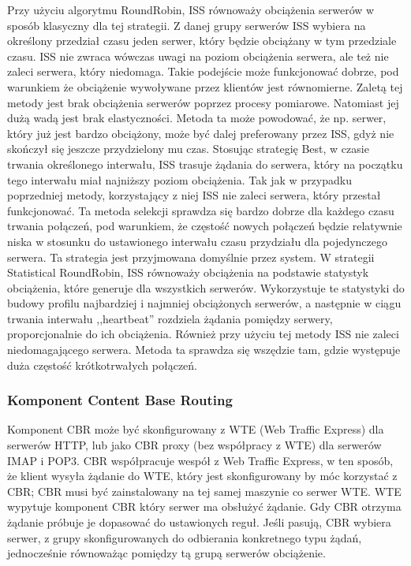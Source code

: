 Przy użyciu algorytmu RoundRobin, ISS równoważy obciążenia serwerów w sposób klasyczny dla tej strategii. Z danej grupy 
serwerów ISS wybiera na określony przedział czasu jeden serwer, który będzie obciążany w tym przedziale czasu. ISS nie zwraca 
wówczas uwagi na poziom obciążenia serwera, ale też nie zaleci serwera, który niedomaga. Takie podejście może funkcjonować 
dobrze, pod warunkiem że obciążenie wywoływane przez klientów jest równomierne. Zaletą tej metody jest brak obciążenia 
serwerów poprzez procesy pomiarowe. Natomiast jej dużą wadą jest brak elastyczności. Metoda ta może powodować, że np. serwer, 
który już jest bardzo obciążony, może być dalej preferowany przez ISS, gdyż nie skończył się jeszcze przydzielony mu czas.
Stosując strategię Best, w czasie trwania określonego interwału, ISS trasuje żądania do serwera, który na początku tego 
interwału miał najniższy poziom obciążenia. Tak jak w przypadku poprzedniej metody, korzystający z niej ISS nie zaleci 
serwera, który przestał funkcjonować. Ta metoda selekcji sprawdza się bardzo dobrze dla każdego czasu trwania połączeń, pod 
warunkiem, że częstość nowych połączeń będzie relatywnie niska w stosunku do ustawionego interwału czasu przydziału dla 
pojedynczego serwera. Ta strategia jest przyjmowana domyślnie przez system.
W strategii Statistical RoundRobin, ISS równoważy obciążenia na podstawie statystyk obciążenia, które generuje dla wszystkich 
serwerów. Wykorzystuje te statystyki do budowy profilu najbardziej i najmniej obciążonych serwerów, a następnie w ciągu 
trwania interwału ,,heartbeat'' rozdziela żądania pomiędzy serwery, proporcjonalnie do ich obciążenia. Również przy użyciu tej 
metody ISS nie zaleci niedomagającego serwera. Metoda ta sprawdza się wszędzie tam, gdzie występuje duża częstość 
krótkotrwałych połączeń.

\subsubsection{Komponent Content Base Routing}
 
Komponent CBR może być skonfigurowany z WTE (Web Traffic Express) dla serwerów HTTP, lub jako CBR proxy (bez współpracy z WTE)
dla serwerów IMAP i POP3. CBR współpracuje wespół z Web Traffic Express, w ten sposób, że klient wysyła żądanie do WTE, który 
jest skonfigurowany by móc korzystać z CBR; CBR musi być zainstalowany na tej samej maszynie co serwer WTE. WTE wypytuje 
komponent CBR który serwer ma obsłużyć żądanie. Gdy CBR otrzyma żądanie próbuje je dopasować do ustawionych reguł. Jeśli 
pasują, CBR wybiera serwer, z grupy skonfigurowanych do odbierania konkretnego typu żądań, jednocześnie równoważąc pomiędzy 
tą grupą serwerów obciążenie. 

